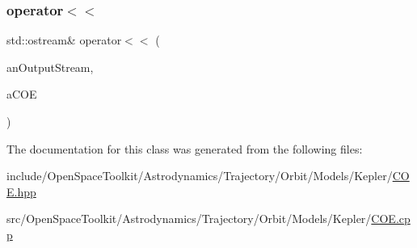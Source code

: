 \subsubsection{\texorpdfstring{operator$<$$<$}{operator<<}}
{\footnotesize\ttfamily std\+::ostream\& operator$<$$<$ (\begin{DoxyParamCaption}\item[{std\+::ostream \&}]{an\+Output\+Stream,  }\item[{const \hyperlink{classostk_1_1astro_1_1trajectory_1_1orbit_1_1models_1_1kepler_1_1_c_o_e}{C\+OE} \&}]{a\+C\+OE }\end{DoxyParamCaption})\hspace{0.3cm}{\ttfamily [friend]}}



The documentation for this class was generated from the following files\+:\begin{DoxyCompactItemize}
\item 
include/\+Open\+Space\+Toolkit/\+Astrodynamics/\+Trajectory/\+Orbit/\+Models/\+Kepler/\hyperlink{_c_o_e_8hpp}{C\+O\+E.\+hpp}\item 
src/\+Open\+Space\+Toolkit/\+Astrodynamics/\+Trajectory/\+Orbit/\+Models/\+Kepler/\hyperlink{_c_o_e_8cpp}{C\+O\+E.\+cpp}\end{DoxyCompactItemize}

